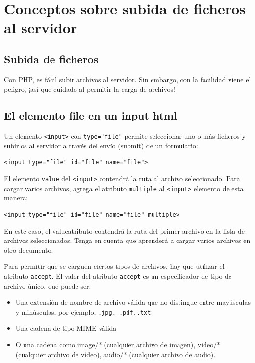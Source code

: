 \documentclass[11pt]{article}
\author{José Manuel Sánchez Álvarez}
\date{<lun 2022-10-17>}
\title{}
\begin{document}
\setcounter{tocdepth}{3}
\tableofcontents

\setlength\parindent{10pt}

\section{Conceptos sobre subida de ficheros al servidor}
\label{sec:org71ff0a6}
\subsection{Subida de ficheros}
\label{sec:orgf5556d1}
Con PHP, es fácil subir archivos al servidor. Sin embargo, con la
facilidad viene el peligro, ¡así que cuidado al permitir la carga de
archivos!

\subsection{El elemento file en un input html}
\label{sec:orgabb1fdc}
Un elemento \texttt{<input>} con \texttt{type="file"}  permite seleccionar uno o más
ficheros y subirlos al servidor a través del envío (submit) de un formulario:
\begin{verbatim}
<input type="file" id="file" name="file">
\end{verbatim}

El elemento \texttt{value} del \texttt{<input>} contendrá la ruta al archivo
seleccionado. Para cargar varios archivos, agrega el atributo \texttt{multiple}
al \texttt{<input>} elemento de esta manera:
\begin{verbatim}
<input type="file" id="file" name="file" multiple>
\end{verbatim}

En este caso, el valueatributo contendrá la ruta del primer archivo en
la lista de archivos seleccionados. Tenga en cuenta que aprenderá a
cargar varios archivos en otro documento.

Para permitir que se carguen ciertos tipos de archivos, hay que utilizar el
atributo \texttt{accept}. El valor del atributo \texttt{accept} es un especificador de
tipo de archivo único, que puede ser:

\begin{itemize}
\item Una extensión de nombre de archivo válida que no distingue entre
mayúsculas y minúsculas, por ejemplo, \texttt{.jpg, .pdf,.txt}
\item Una cadena de tipo MIME válida
\item O una cadena como image/* (cualquier archivo de imagen),
video/* (cualquier archivo de vídeo), audio/* (cualquier archivo de
audio).
\end{itemize}
\end{document}
